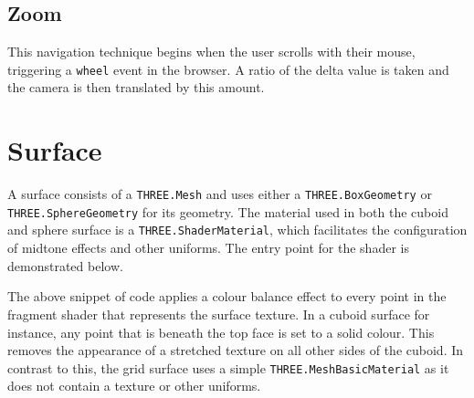 {{		
	
	}

	\subsection{Zoom} {
	\label{sec:zoom}

		This navigation technique begins when the user scrolls with their mouse, triggering a \texttt{wheel} event in the browser. A ratio of the delta value is taken and the camera is then translated by this amount.
	
	}

}

\section{Surface} {
\label{sec:surface}

	\begin{sloppypar}
		A surface consists of a \texttt{THREE.Mesh} and uses either a \texttt{THREE.BoxGeometry} or \texttt{THREE.SphereGeometry} for its geometry. The material used in both the cuboid and sphere surface is a \texttt{THREE.ShaderMaterial}, which facilitates the configuration of midtone effects and other uniforms. The entry point for the shader is demonstrated below.
	\end{sloppypar}

	

	The above snippet of code applies a colour balance effect to every point in the fragment shader that represents the surface texture. In a cuboid surface for instance, any point that is beneath the top face is set to a solid colour. This removes the appearance of a stretched texture on all other sides of the cuboid. In contrast to this, the grid surface uses a simple \texttt{THREE.MeshBasicMaterial} as it does not contain a texture or other uniforms.

}

